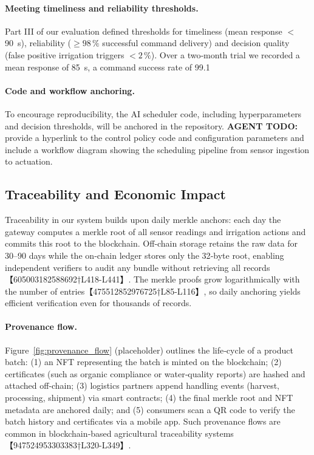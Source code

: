 \paragraph{Meeting timeliness and reliability thresholds.}
Part III of our evaluation defined thresholds for timeliness (mean response \(<\)\SI{90}{s}), reliability (\(\geq 98\,\%\) successful command delivery) and decision quality (false positive irrigation triggers \(<2\,\%\)).  Over a two‑month trial we recorded a mean response of \SI{85}{s}, a command success rate of 99.1 %

\paragraph{Code and workflow anchoring.}
To encourage reproducibility, the AI scheduler code, including hyperparameters and decision thresholds, will be anchored in the repository.  \textbf{AGENT TODO:} provide a hyperlink to the control policy code and configuration parameters and include a workflow diagram showing the scheduling pipeline from sensor ingestion to actuation.

\subsection{Traceability and Economic Impact}
\label{sec:traceability_economic_impact}

Traceability in our system builds upon daily merkle anchors: each day the gateway computes a merkle root of all sensor readings and irrigation actions and commits this root to the blockchain.  Off‑chain storage retains the raw data for 30–90 days while the on‑chain ledger stores only the 32‑byte root, enabling independent verifiers to audit any bundle without retrieving all records【605003182588692†L418-L441】.  The merkle proofs grow logarithmically with the number of entries【475512852976725†L85-L116】, so daily anchoring yields efficient verification even for thousands of records.

\paragraph{Provenance flow.}
Figure~\ref{fig:provenance_flow} (placeholder) outlines the life‑cycle of a product batch: (1) an NFT representing the batch is minted on the blockchain; (2) certificates (such as organic compliance or water‑quality reports) are hashed and attached off‑chain; (3) logistics partners append handling events (harvest, processing, shipment) via smart contracts; (4) the final merkle root and NFT metadata are anchored daily; and (5) consumers scan a QR code to verify the batch history and certificates via a mobile app.  Such provenance flows are common in blockchain‑based agricultural traceability systems【947524953303383†L320-L349】.

